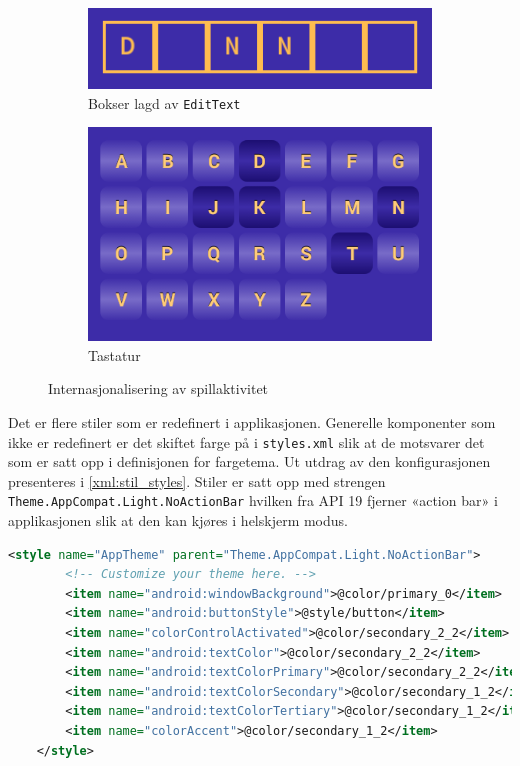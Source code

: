 \begin{figure}[ht]
    \centering
   \begin{subfigure}[b]{0.3\textwidth}
        \includegraphics[width=\textwidth]{./img/gui/2.png}
        \caption{Bokser lagd av \texttt{EditText}}
        \label{fig:gui_bokser}
    \end{subfigure}
    \begin{subfigure}[b]{0.3\textwidth}
        \includegraphics[width=\textwidth]{./img/gui/3.png}
        \caption{Tastatur}
        \label{fig:gui_tastatur_eng}
    \end{subfigure}
    \caption{Internasjonalisering av spillaktivitet}
    \label{fig:custom_gui_comp}
\end{figure}

Det er flere stiler som er redefinert i applikasjonen. Generelle komponenter som ikke er redefinert er det skiftet farge på i \texttt{styles.xml} slik at de motsvarer det som er satt opp i definisjonen for fargetema. Ut utdrag av den konfigurasjonen presenteres i \ref{xml:stil_styles}. Stiler er satt opp med strengen \texttt{Theme.AppCompat.Light.NoActionBar} hvilken fra API 19 fjerner «action bar» i applikasjonen slik at den kan kjøres i helskjerm modus. 

\begin{lstlisting}[language=XML, caption=Deler av \texttt{styles.xml}, label=xml:stil_styles]
    <style name="AppTheme" parent="Theme.AppCompat.Light.NoActionBar">
        <!-- Customize your theme here. -->
        <item name="android:windowBackground">@color/primary_0</item>
        <item name="android:buttonStyle">@style/button</item>
        <item name="colorControlActivated">@color/secondary_2_2</item>
        <item name="android:textColor">@color/secondary_2_2</item>
        <item name="android:textColorPrimary">@color/secondary_2_2</item>
        <item name="android:textColorSecondary">@color/secondary_1_2</item>
        <item name="android:textColorTertiary">@color/secondary_1_2</item>
        <item name="colorAccent">@color/secondary_1_2</item>
    </style>
\end{lstlisting}

